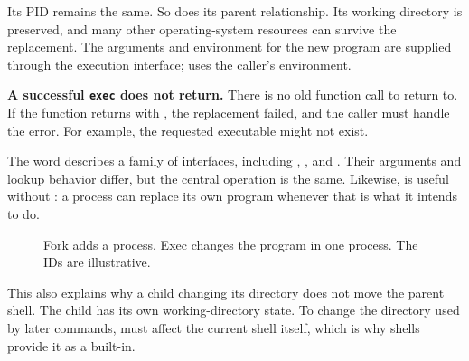 \documentclass[11pt]{article}
\begin{document}
Its PID remains the same.
So does its parent relationship.
Its working directory is preserved, and many other operating-system resources can survive the replacement.
The arguments and environment for the new program are supplied through the execution interface;  uses the caller's environment.

\textbf{A successful \texttt{exec} does not return.}
There is no old function call to return to.
If the function returns with , the replacement failed, and the caller must handle the error.
For example, the requested executable might not exist.

The word  describes a family of interfaces, including , , and .
Their arguments and lookup behavior differ, but the central operation is the same.
Likewise,  is useful without : a process can replace its own program whenever that is what it intends to do.

\begin{figure}[H]
\centering
{}
\caption{Fork adds a process.
Exec changes the program in one process.
The IDs are illustrative.}
\end{figure}

This also explains why a child changing its directory does not move the parent shell.
The child has its own working-directory state.
To change the directory used by later commands,  must affect the current shell itself, which is why shells provide it as a built-in.
\end{document}
